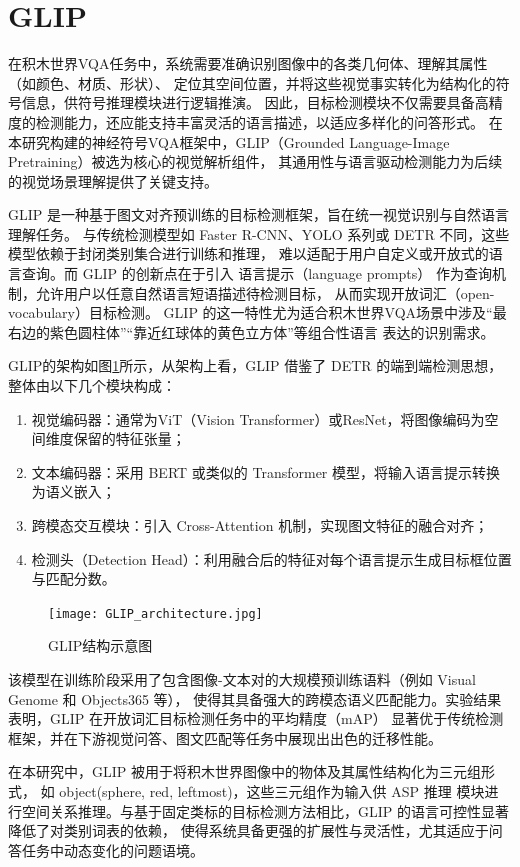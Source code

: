 \section{GLIP}
在积木世界VQA任务中，系统需要准确识别图像中的各类几何体、理解其属性（如颜色、材质、形状）、
定位其空间位置，并将这些视觉事实转化为结构化的符号信息，供符号推理模块进行逻辑推演。
因此，目标检测模块不仅需要具备高精度的检测能力，还应能支持丰富灵活的语言描述，以适应多样化的问答形式。
在本研究构建的神经符号VQA框架中，GLIP（Grounded Language-Image Pretraining）被选为核心的视觉解析组件，
其通用性与语言驱动检测能力为后续的视觉场景理解提供了关键支持。

GLIP 是一种基于图文对齐预训练的目标检测框架，旨在统一视觉识别与自然语言理解任务。
与传统检测模型如 Faster R-CNN、YOLO 系列或 DETR 不同，这些模型依赖于封闭类别集合进行训练和推理，
难以适配于用户自定义或开放式的语言查询。而 GLIP 的创新点在于引入 语言提示（language prompts） 
作为查询机制，允许用户以任意自然语言短语描述待检测目标，
从而实现开放词汇（open-vocabulary）目标检测\cite{li2022grounded}。
GLIP 的这一特性尤为适合积木世界VQA场景中涉及“最右边的紫色圆柱体”“靠近红球体的黄色立方体”等组合性语言
表达的识别需求。

GLIP的架构如图\ref{GLIP_architecture}所示，从架构上看，GLIP 借鉴了 DETR 的端到端检测思想，整体由以下几个模块构成：
\begin{enumerate}[nosep]
\item 视觉编码器：通常为ViT（Vision Transformer）或ResNet，将图像编码为空间维度保留的特征张量；
\item 文本编码器：采用 BERT 或类似的 Transformer 模型，将输入语言提示转换为语义嵌入；
\item 跨模态交互模块：引入 Cross-Attention 机制，实现图文特征的融合对齐；
\item 检测头（Detection Head）：利用融合后的特征对每个语言提示生成目标框位置与匹配分数。
\end{enumerate}
\begin{figure}[h]
    \centering
    \texttt{[image: GLIP\_architecture.jpg]}
    \caption{GLIP结构示意图\label{GLIP_architecture}}
\end{figure}

该模型在训练阶段采用了包含图像-文本对的大规模预训练语料（例如 Visual Genome 和 Objects365 等），
使得其具备强大的跨模态语义匹配能力。实验结果表明，GLIP 在开放词汇目标检测任务中的平均精度（mAP）
显著优于传统检测框架，并在下游视觉问答、图文匹配等任务中展现出出色的迁移性能\cite{li2022grounded}。

在本研究中，GLIP 被用于将积木世界图像中的物体及其属性结构化为三元组形式，
如 object(sphere, red, leftmost)，这些三元组作为输入供 ASP 推理
模块进行空间关系推理。与基于固定类标的目标检测方法相比，GLIP 的语言可控性显著降低了对类别词表的依赖，
使得系统具备更强的扩展性与灵活性，尤其适应于问答任务中动态变化的问题语境。

